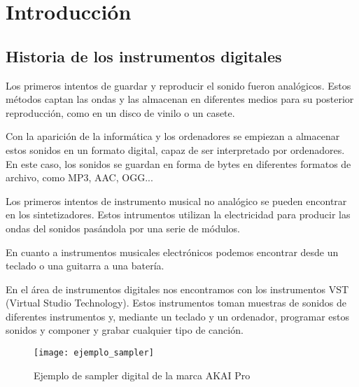 
\chapter{Introducción} %
\label{cha:Introduccion}

    \section{Historia de los instrumentos digitales} %
    \label{sec:HistoriaDeLosInstrumentosDigitales}

        Los primeros intentos de guardar y reproducir el sonido fueron analógicos. Estos métodos captan las ondas y las
        almacenan en diferentes medios para su posterior reproducción, como en un disco de vinilo o un casete.

        Con la aparición de la informática y los ordenadores se empiezan a almacenar estos sonidos en un formato
        digital, capaz de ser interpretado por ordenadores. En este caso, los sonidos se guardan en forma de bytes en
        diferentes formatos de archivo, como MP3, AAC, OGG...

        Los primeros intentos de instrumento musical no analógico se pueden encontrar en los sintetizadores. Estos
        intrumentos utilizan la electricidad para producir las ondas del sonidos pasándola por una serie de módulos.

        En cuanto a instrumentos musicales electrónicos podemos encontrar desde un teclado o una guitarra a una batería.

        En el área de instrumentos digitales nos encontramos con los instrumentos VST (Virtual Studio Technology). Estos
        instrumentos toman muestras de sonidos de diferentes instrumentos y, mediante un teclado y un ordenador,
        programar estos sonidos y componer y grabar cualquier tipo de canción.\cite{historia_instrumentos_digitales}

        \begin{figure}[ht]
            \centering
            \texttt{[image: ejemplo\_sampler]}
            \caption{Ejemplo de sampler digital de la marca AKAI Pro\label{fig:EjemploSampler}}
        \end{figure}

    
